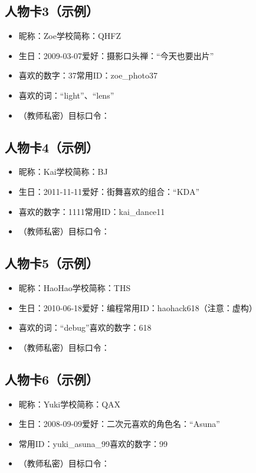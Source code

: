 \documentclass[UTF8,a4paper,12pt]{ctexart}
\begin{document}
\subsection*{人物卡3（示例）}
\begin{itemize}
  \item 昵称：Zoe\quad 学校简称：QHFZ
  \item 生日：2009-03-07\quad 爱好：摄影\quad 口头禅：``今天也要出片''
  \item 喜欢的数字：37\quad 常用ID：zoe\_photo37
  \item 喜欢的词：``light''、``lens''
  \item （教师私密）目标口令：\underline{\hspace{10em}}
\end{itemize}

\subsection*{人物卡4（示例）}
\begin{itemize}
  \item 昵称：Kai\quad 学校简称：BJ
  \item 生日：2011-11-11\quad 爱好：街舞\quad 喜欢的组合：``KDA''
  \item 喜欢的数字：1111\quad 常用ID：kai\_dance11
  \item （教师私密）目标口令：\underline{\hspace{10em}}
\end{itemize}

\subsection*{人物卡5（示例）}
\begin{itemize}
  \item 昵称：HaoHao\quad 学校简称：THS
  \item 生日：2010-06-18\quad 爱好：编程\quad 常用ID：haohack618（注意：虚构）
  \item 喜欢的词：``debug''\quad 喜欢的数字：618
  \item （教师私密）目标口令：\underline{\hspace{10em}}
\end{itemize}

\subsection*{人物卡6（示例）}
\begin{itemize}
  \item 昵称：Yuki\quad 学校简称：QAX
  \item 生日：2008-09-09\quad 爱好：二次元\quad 喜欢的角色名：``Asuna''
  \item 常用ID：yuki\_asuna\_99\quad 喜欢的数字：99
  \item （教师私密）目标口令：\underline{\hspace{10em}}
\end{itemize}
\end{document}
